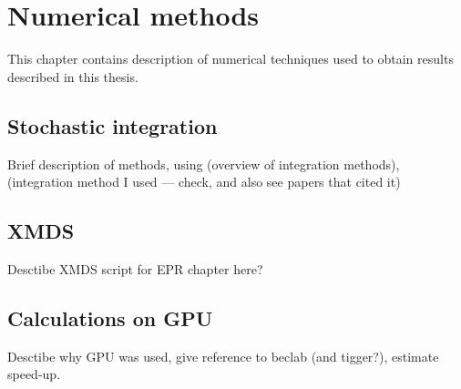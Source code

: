 \chapter{Numerical methods}

This chapter contains description of numerical techniques used to obtain results described in this thesis.


\section{Stochastic integration}

Brief description of methods, using \cite{Werner1997} (overview of integration methods), \cite{Klauder1985} (integration method I used --- check, and also see papers that cited it)


\section{XMDS}

Desctibe XMDS script for EPR chapter here?

\section{Calculations on GPU}

Desctibe why GPU was used, give reference to beclab (and tigger?), estimate speed-up.
